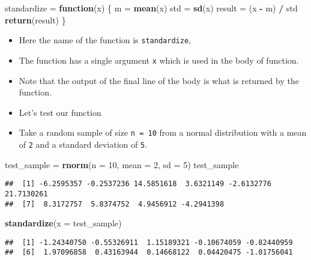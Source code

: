 \documentclass[]{book}
\newenvironment{Shaded}{\begin{snugshade}}{\end{snugshade}}
\newcommand{\ControlFlowTok}[1]{\textcolor[rgb]{0.13,0.29,0.53}{\textbf{#1}}}
\newcommand{\DataTypeTok}[1]{\textcolor[rgb]{0.13,0.29,0.53}{#1}}
\newcommand{\DecValTok}[1]{\textcolor[rgb]{0.00,0.00,0.81}{#1}}
\newcommand{\KeywordTok}[1]{\textcolor[rgb]{0.13,0.29,0.53}{\textbf{#1}}}
\newcommand{\NormalTok}[1]{#1}
\newcommand{\OperatorTok}[1]{\textcolor[rgb]{0.81,0.36,0.00}{\textbf{#1}}}
\newcommand{\StringTok}[1]{\textcolor[rgb]{0.31,0.60,0.02}{#1}}
\begin{document}
\begin{Shaded}
\begin{Highlighting}[]
\NormalTok{standardize =}\StringTok{ }\ControlFlowTok{function}\NormalTok{(x) \{}
\NormalTok{  m =}\StringTok{ }\KeywordTok{mean}\NormalTok{(x)}
\NormalTok{  std =}\StringTok{ }\KeywordTok{sd}\NormalTok{(x)}
\NormalTok{  result =}\StringTok{ }\NormalTok{(x }\OperatorTok{-}\StringTok{ }\NormalTok{m) }\OperatorTok{/}\StringTok{ }\NormalTok{std}
  \KeywordTok{return}\NormalTok{(result)}
\NormalTok{\}}
\end{Highlighting}
\end{Shaded}

\begin{itemize}
\item
  Here the name of the function is \texttt{standardize},
\item
  The function has a single argument \texttt{x} which is used in the body of function.
\item
  Note that the output of the final line of the body is what is returned by the function.
\item
  Let's test our function
\item
  Take a random sample of size \texttt{n\ =\ 10} from a normal distribution with a mean of \texttt{2} and a standard deviation of \texttt{5}.
\end{itemize}

\begin{Shaded}
\begin{Highlighting}[]
\NormalTok{test_sample =}\StringTok{ }\KeywordTok{rnorm}\NormalTok{(}\DataTypeTok{n =} \DecValTok{10}\NormalTok{, }\DataTypeTok{mean =} \DecValTok{2}\NormalTok{, }\DataTypeTok{sd =} \DecValTok{5}\NormalTok{)}
\NormalTok{test_sample}
\end{Highlighting}
\end{Shaded}

\begin{verbatim}
##  [1] -6.2595357 -0.2537236 14.5851618  3.6321149 -2.6132776 21.7130261
##  [7]  8.3172757  5.8374752  4.9456912 -4.2941398
\end{verbatim}

\begin{Shaded}
\begin{Highlighting}[]
\KeywordTok{standardize}\NormalTok{(}\DataTypeTok{x =}\NormalTok{ test_sample)}
\end{Highlighting}
\end{Shaded}

\begin{verbatim}
##  [1] -1.24340750 -0.55326911  1.15189321 -0.10674059 -0.82440959
##  [6]  1.97096858  0.43163944  0.14668122  0.04420475 -1.01756041
\end{verbatim}
\end{document}
